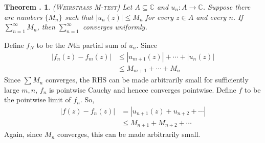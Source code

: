 \documentclass[twoside]{report}
\newcommand{\C}{\mathbb{C}}
\newcounter{Lecture}
\theoremstyle{myts}
\newcounter{c}[Lecture]
\newtheorem{thm}[c]{Theorem \arabic{Lecture}.}
\newenvironment{prf}{
  \noindent\begin{mdframed}[style=prf]}{\end{mdframed} \vspace{1em}
}
\begin{document}
\begin{thm}
  ({\scshape Weirstrass M-test}) Let \(A\subseteq\C\) and \( u_n : A \to \C \). Suppose there are numbers \( \{ M_n \} \) such that \(  | u_n(z) | \leq M_n \) for every \(z\in A\) and every $n$. If \( \sum_{n=1}^\infty M_n \), then \( \sum_{n=1}^\infty \) converges uniformly.
\end{thm}

\begin{prf}
  Define $f_N$ to be the $N$th partial sum of $u_n$. Since
  \begin{align*}
    | f_n(z) - f_m(z) | &\leq |u_{m+1}(z)| + \cdots + |u_{n}(z)| \\
      &\leq M_{m+1} + \cdots + M_{n}
  \end{align*}
  Since \(\sum M_n\) converges, the RHS can be made arbitrarily small for sufficiently large $m,n$, $f_n$ is pointwise Cauchy and hencce converges pointwise. Define $f$ to be the pointwise limit of $f_n$. So,
  \begin{align*}
    | f(z) - f_n(z) | &= | u_{n+1}(z) + u_{n+2} + \cdots | \\
      &\leq M_{n+1} + M_{n+2} + \cdots
  \end{align*}
  Again, since $M_n$ converges, this can be made arbitrarily small. 
\end{prf}
\end{document}
